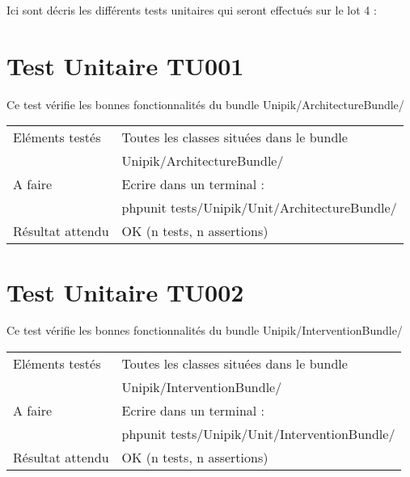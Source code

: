 
Ici sont décris les différents tests unitaires qui seront effectués sur le lot 4 :

\section{Test Unitaire TU001}
	
	Ce test vérifie les bonnes fonctionnalités du bundle Unipik/ArchitectureBundle/ \\
				
  	\begin{center}
  		\begin{tabular}[h]{|p{}|p{}|}
		\hline
			Eléments testés & Toutes les classes situées dans le bundle \\ 																& Unipik/ArchitectureBundle/ \\\hline
    			A faire & Ecrire dans un terminal : \\ 
    					& phpunit tests/Unipik/Unit/ArchitectureBundle/\\\hline
    			Résultat attendu & OK (n tests, n assertions) \\\hline
     	\end{tabular}
  	\end{center}	
  		
\section{Test Unitaire TU002}
	
	Ce test vérifie les bonnes fonctionnalités du bundle Unipik/InterventionBundle/ \\
				
  	\begin{center}
  		\begin{tabular}[h]{|p{}|p{}|}
		\hline
			Eléments testés & Toutes les classes situées dans le bundle \\ 																& Unipik/InterventionBundle/ \\\hline
    			A faire & Ecrire dans un terminal : \\ 
    					& phpunit tests/Unipik/Unit/InterventionBundle/\\\hline
    			Résultat attendu & OK (n tests, n assertions) \\\hline
     	\end{tabular}
  	\end{center}	   		
   		
